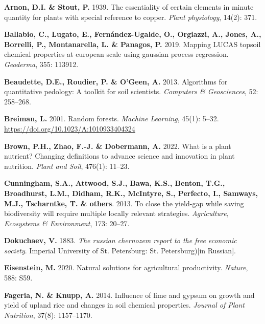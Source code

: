 \documentclass[
  10pt,
  b5paper,
  oneside]{book}
\newlength{\cslhangindent}
\newlength{\cslentryspacingunit} %
\newenvironment{CSLReferences}[2] %
 {%
  \setlength{\parindent}{0pt}
  \ifodd #1
  \let\oldpar\par
  \def\par{\hangindent=\cslhangindent\oldpar}
  \fi
  \setlength{\parskip}{#2\cslentryspacingunit}
 }%
 {}
\begin{document}
\hypertarget{refs}{}
\begin{CSLReferences}{0}{0}
\leavevmode{}%
\textbf{Arnon, D.I. \& Stout, P.} 1939. The essentiality of certain elements in minute quantity for plants with special reference to copper. \emph{Plant physiology}, 14(2): 371.

\leavevmode{}%
\textbf{Ballabio, C., Lugato, E., Fernández-Ugalde, O., Orgiazzi, A., Jones, A., Borrelli, P., Montanarella, L. \& Panagos, P.} 2019. Mapping LUCAS topsoil chemical properties at european scale using gaussian process regression. \emph{Geoderma}, 355: 113912.

\leavevmode{}%
\textbf{Beaudette, D.E., Roudier, P. \& O'Geen, A.} 2013. Algorithms for quantitative pedology: A toolkit for soil scientists. \emph{Computers \& Geosciences}, 52: 258--268.

\leavevmode{}%
\textbf{Breiman, L.} 2001. Random forests. \emph{Machine Learning}, 45(1): 5--32. \url{https://doi.org/10.1023/A:1010933404324}

\leavevmode{}%
\textbf{Brown, P.H., Zhao, F.-J. \& Dobermann, A.} 2022. What is a plant nutrient? Changing definitions to advance science and innovation in plant nutrition. \emph{Plant and Soil}, 476(1): 11--23.

\leavevmode{}%
\textbf{Cunningham, S.A., Attwood, S.J., Bawa, K.S., Benton, T.G., Broadhurst, L.M., Didham, R.K., McIntyre, S., Perfecto, I., Samways, M.J., Tscharntke, T. \& others}. 2013. To close the yield-gap while saving biodiversity will require multiple locally relevant strategies. \emph{Agriculture, Ecosystems \& Environment}, 173: 20--27.

\leavevmode{}%
\textbf{Dokuchaev, V.} 1883. \emph{The russian chernozem report to the free economic society}. Imperial University of St. Petersburg: St. Petersburg){[}in Russian{]}.

\leavevmode{}%
\textbf{Eisenstein, M.} 2020. Natural solutions for agricultural productivity. \emph{Nature}, 588: S59.

\leavevmode{}%
\textbf{Fageria, N. \& Knupp, A.} 2014. Influence of lime and gypsum on growth and yield of upland rice and changes in soil chemical properties. \emph{Journal of Plant Nutrition}, 37(8): 1157--1170.


\end{CSLReferences}
\end{document}
